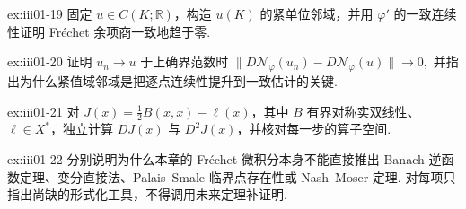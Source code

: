 \begin{FAExercise}{ex:iii01-19}
固定 \(\displaystyle u\in C(K;\mathbb R)\)，构造 \(\displaystyle u(K)\) 的紧单位邻域，并用 \(\displaystyle\varphi'\) 的一致连续性证明 Fréchet 余项商一致地趋于零.
\end{FAExercise}

\begin{FAExercise}{ex:iii01-20}
证明 \(\displaystyle u_n\to u\) 于上确界范数时
\(\displaystyle \|D\mathcal N_{\varphi}(u_n)-D\mathcal N_{\varphi}(u)\| \longrightarrow0,\)
并指出为什么紧值域邻域是把逐点连续性提升到一致估计的关键.
\end{FAExercise}

\begin{FAExercise}{ex:iii01-21}
对 \(\displaystyle J(x)=\frac{1}{2}B(x,x)-\ell(x)\)，其中 \(\displaystyle B\) 有界对称实双线性、\(\displaystyle\ell\in X^*\)，独立计算 \(\displaystyle DJ(x)\) 与 \(\displaystyle D^2J(x)\)，并核对每一步的算子空间.
\end{FAExercise}

\begin{FAExercise}[后续边界]{ex:iii01-22}
分别说明为什么本章的 Fréchet 微积分本身不能直接推出 Banach 逆函数定理、变分直接法、Palais--Smale 临界点存在性或 Nash--Moser 定理. 对每项只指出尚缺的形式化工具，不得调用未来定理补证明.
\end{FAExercise}
